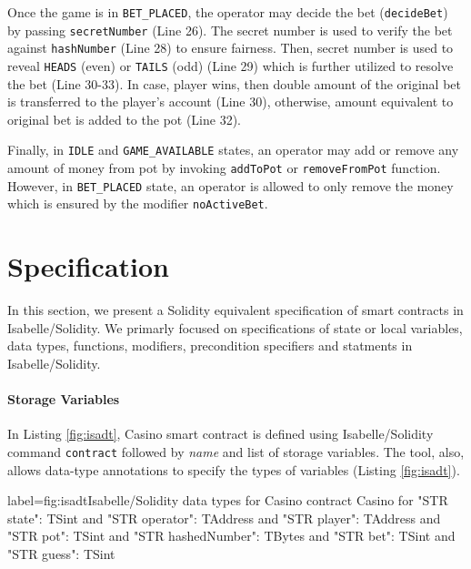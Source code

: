 \documentclass[a4paper,UKenglish,cleveref, autoref, thm-restate]{oasics-v2021}
\begin{document}
%
Once the game is in \texttt{BET\_PLACED}, the operator may decide the bet (\texttt{decideBet}) by passing \texttt{secretNumber} (Line 26). The secret number is used to verify the bet against \texttt{hashNumber} (Line 28) to ensure fairness. 
%
Then, secret number is used to reveal \texttt{HEADS} (even) or \texttt{TAILS} (odd) (Line 29) which is further utilized to resolve the bet (Line 30-33).
%
In case, player wins,  then double amount of the original bet is transferred to the player's account (Line 30), otherwise, amount equivalent to original bet is added to the pot (Line 32). 
%

%
Finally, in \texttt{IDLE} and \texttt{GAME\_AVAILABLE} states, an operator may add or remove any amount of money from pot  by invoking \texttt{addToPot} or \texttt{removeFromPot} function.
However, in \texttt{BET\_PLACED} state, an operator is allowed to only remove the money which is ensured by the modifier \texttt{noActiveBet}.
%
%
\section{Specification}
In this section, we present a Solidity equivalent specification of smart contracts in Isabelle/Solidity. 
%
We primarly focused on specifications of state or local variables, data types, functions, modifiers, precondition specifiers and statments in Isabelle/Solidity.
\paragraph*{Storage Variables}
%
%
In Listing \ref{fig:isadt}, Casino smart contract is defined using Isabelle/Solidity command \texttt{\color{isacom}contract} followed by \emph{name} and list of storage variables.
%
The tool, also,  allows data-type annotations to specify the types of variables (Listing \ref{fig:isadt}).
\begin{isabelle}{label={fig:isadt}}{Isabelle/Solidity data types for Casino}
contract Casino
  	for "STR state": TSint
  	and "STR operator": TAddress
 	and "STR player": TAddress
  	and "STR pot": TSint
  	and "STR hashedNumber": TBytes
  	and "STR bet": TSint
  	and "STR guess": TSint
\end{isabelle}
%
%	
%
\end{document}
